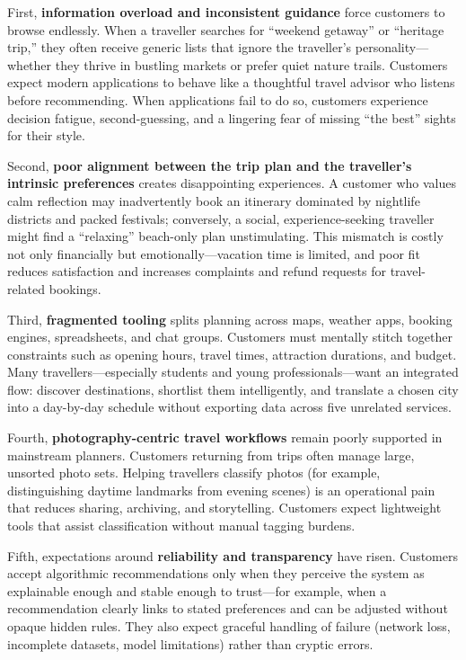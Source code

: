 \documentclass[12pt,oneside,openany]{report}
\begin{document}
First, \textbf{information overload and inconsistent guidance} force customers to browse endlessly. When a traveller searches for ``weekend getaway'' or ``heritage trip,'' they often receive generic lists that ignore the traveller's personality---whether they thrive in bustling markets or prefer quiet nature trails. Customers expect modern applications to behave like a thoughtful travel advisor who listens before recommending. When applications fail to do so, customers experience decision fatigue, second-guessing, and a lingering fear of missing ``the best'' sights for their style.

Second, \textbf{poor alignment between the trip plan and the traveller's intrinsic preferences} creates disappointing experiences. A customer who values calm reflection may inadvertently book an itinerary dominated by nightlife districts and packed festivals; conversely, a social, experience-seeking traveller might find a ``relaxing'' beach-only plan unstimulating. This mismatch is costly not only financially but emotionally---vacation time is limited, and poor fit reduces satisfaction and increases complaints and refund requests for travel-related bookings.

Third, \textbf{fragmented tooling} splits planning across maps, weather apps, booking engines, spreadsheets, and chat groups. Customers must mentally stitch together constraints such as opening hours, travel times, attraction durations, and budget. Many travellers---especially students and young professionals---want an integrated flow: discover destinations, shortlist them intelligently, and translate a chosen city into a day-by-day schedule without exporting data across five unrelated services.

Fourth, \textbf{photography-centric travel workflows} remain poorly supported in mainstream planners. Customers returning from trips often manage large, unsorted photo sets. Helping travellers classify photos (for example, distinguishing daytime landmarks from evening scenes) is an operational pain that reduces sharing, archiving, and storytelling. Customers expect lightweight tools that assist classification without manual tagging burdens.

Fifth, expectations around \textbf{reliability and transparency} have risen. Customers accept algorithmic recommendations only when they perceive the system as explainable enough and stable enough to trust---for example, when a recommendation clearly links to stated preferences and can be adjusted without opaque hidden rules. They also expect graceful handling of failure (network loss, incomplete datasets, model limitations) rather than cryptic errors.
\end{document}

